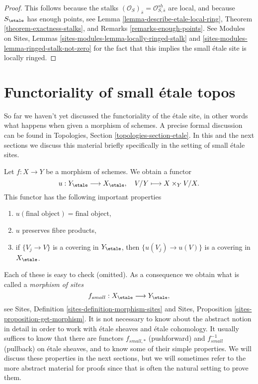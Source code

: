 \begin{proof}
This follows because the stalks
$(\mathcal{O}_S)_{\overline{s}} = \mathcal{O}^{sh}_{S, \overline{s}}$ are
local, and because $S_\etale$ has enough points, see
Lemma \ref{lemma-describe-etale-local-ring},
Theorem \ref{theorem-exactness-stalks},
and
Remarks \ref{remarks-enough-points}.
See
Modules on Sites, Lemmas \ref{sites-modules-lemma-locally-ringed-stalk} and
\ref{sites-modules-lemma-ringed-stalk-not-zero}
for the fact that this implies the small \'etale site is locally ringed.
\end{proof}






\section{Functoriality of small \'etale topos}
\label{section-functoriality}

\noindent
So far we haven't yet discussed the functoriality of the \'etale site, in
other words what happens when given a morphism of schemes. A precise formal
discussion can be found in
Topologies, Section \ref{topologies-section-etale}.
In this and the next sections we discuss this material briefly specifically
in the setting of small \'etale sites.

\medskip\noindent
Let $f : X \to Y$ be a morphism of schemes. We obtain a functor
\begin{equation}
\label{equation-functorial}
u : Y_\etale \longrightarrow X_\etale, \quad
V/Y \longmapsto X \times_Y V/X.
\end{equation}
This functor has the following important properties
\begin{enumerate}
\item $u(\text{final object}) = \text{final object}$,
\item $u$ preserves fibre products,
\item if $\{V_j \to V\}$ is a covering in $Y_\etale$, then
$\{u(V_j) \to u(V)\}$ is a covering in $X_\etale$.
\end{enumerate}
Each of these is easy to check (omitted). As a consequence we obtain what
is called a {\it morphism of sites}
$$
f_{small} : X_\etale \longrightarrow Y_\etale,
$$
see
Sites, Definition \ref{sites-definition-morphism-sites}
and
Sites, Proposition \ref{sites-proposition-get-morphism}.
It is not necessary to know about the abstract notion in detail
in order to work with \'etale sheaves and \'etale cohomology.
It usually suffices to know that there are functors
$f_{small, *}$ (pushforward) and $f_{small}^{-1}$ (pullback)
on \'etale sheaves, and to know some of their simple properties.
We will discuss these properties in the next sections, but we will
sometimes refer to the more abstract material for proofs since
that is often the natural setting to prove them.


